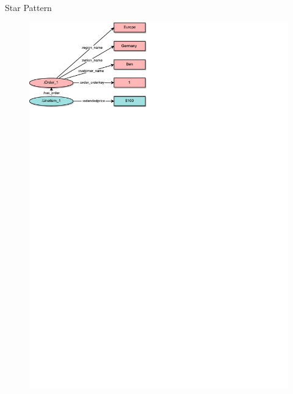 %    
%


\begin{frame}{\patsec}{Star Pattern}
    \begin{figure}
        \includegraphics[trim=0 648 255 0,clip,width=1\textwidth]{images/starpattern.pdf}
    \end{figure}
\end{frame}

